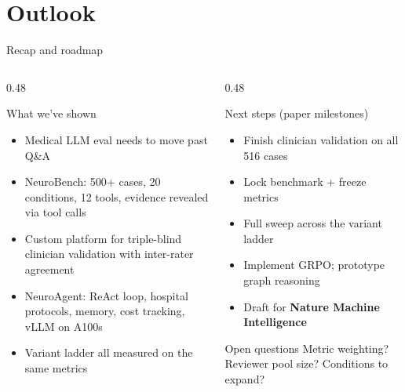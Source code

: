 \documentclass[aspectratio=169,t]{beamer}
\begin{document}
\section{Outlook}

\begin{frame}{Recap and roadmap}
  \begin{columns}[T,onlytextwidth]
    \begin{column}{0.48\textwidth}
      \begin{block}{What we've shown}
        \footnotesize
        \begin{itemize}\setlength\itemsep{0.1em}
          \item Medical LLM eval needs to move past Q\&A
          \item NeuroBench: 500+ cases, 20 conditions, 12 tools,
                evidence revealed via tool calls
          \item Custom platform for triple-blind clinician validation
                with inter-rater agreement
          \item NeuroAgent: ReAct loop, hospital protocols, memory,
                cost tracking, vLLM on A100s
          \item Variant ladder all measured on the same metrics
        \end{itemize}
      \end{block}
    \end{column}%
    \hfill
    \begin{column}{0.48\textwidth}
      \begin{exampleblock}{Next steps (paper milestones)}
        \footnotesize
        \begin{itemize}\setlength\itemsep{0.05em}
          \item Finish clinician validation on all 516 cases
          \item Lock benchmark + freeze metrics
          \item Full sweep across the variant ladder
          \item Implement GRPO; prototype graph reasoning
          \item Draft for \textbf{Nature Machine Intelligence}
        \end{itemize}
      \end{exampleblock}
      \begin{alertblock}{Open questions}
        \footnotesize
        Metric weighting? Reviewer pool size? Conditions to expand?
      \end{alertblock}
    \end{column}
  \end{columns}
\end{frame}
\end{document}
